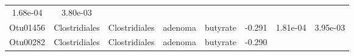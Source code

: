 \documentclass[11pt,]{article}
\begin{document}
\begin{longtable}[]{@{}cccccccc@{}}
\begin{minipage}[t]{0.08\columnwidth}
1.68e-04\strut
\end{minipage} & \begin{minipage}[t]{0.08\columnwidth}\centering\strut
3.80e-03\strut
\end{minipage}\tabularnewline
\begin{minipage}[t]{0.08\columnwidth}\centering\strut
Otu01456\strut
\end{minipage} & \begin{minipage}[t]{0.15\columnwidth}\centering\strut
Clostridiales\strut
\end{minipage} & \begin{minipage}[t]{0.15\columnwidth}\centering\strut
Clostridiales\strut
\end{minipage} & \begin{minipage}[t]{0.08\columnwidth}\centering\strut
adenoma\strut
\end{minipage} & \begin{minipage}[t]{0.09\columnwidth}\centering\strut
butyrate\strut
\end{minipage} & \begin{minipage}[t]{0.07\columnwidth}\centering\strut
-0.291\strut
\end{minipage} & \begin{minipage}[t]{0.08\columnwidth}\centering\strut
1.81e-04\strut
\end{minipage} & \begin{minipage}[t]{0.08\columnwidth}\centering\strut
3.95e-03\strut
\end{minipage}\tabularnewline
\begin{minipage}[t]{0.08\columnwidth}\centering\strut
Otu00282\strut
\end{minipage} & \begin{minipage}[t]{0.15\columnwidth}\centering\strut
Clostridiales\strut
\end{minipage} & \begin{minipage}[t]{0.15\columnwidth}\centering\strut
Clostridiales\strut
\end{minipage} & \begin{minipage}[t]{0.08\columnwidth}\centering\strut
adenoma\strut
\end{minipage} & \begin{minipage}[t]{0.09\columnwidth}\centering\strut
butyrate\strut
\end{minipage} & \begin{minipage}[t]{0.07\columnwidth}\centering\strut
-0.290\strut
\end{minipage} & \begin{minipage}[t]{0.08\columnwidth}\centering\strut

\end{minipage}
\end{longtable}
\end{document}

